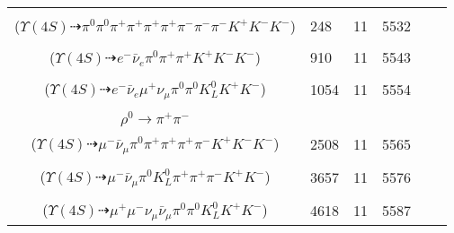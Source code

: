 \documentclass[landscape]{article}
\newcounter{rownumbers}
\newcommand\rn{\stepcounter{rownumbers}\arabic{rownumbers}}
\newcommand{\EOL}{\\} %
\newcommand{\topoTags}[1]{#1} %
\begin{document}
\begin{longtable}{clcccc}
\rn & \makecell[l]{ $ 
\Upsilon(4S) \rightarrow B^{0} \bar{B}^{0} ,
B^{0} \rightarrow \pi^{0} K^{+} K^{-} ,
\bar{B}^{0} \rightarrow \pi^{+} \pi^{+} \pi^{-} \pi^{-} \pi^{-} D^{*+} ,
D^{*+} \rightarrow \pi^{+} D^{0} ,
D^{0} \rightarrow \pi^{0} \pi^{+} K^{-} 
$ \\ ($
\Upsilon(4S) \dashrightarrow \pi^{0} \pi^{0} \pi^{+} \pi^{+} \pi^{+} \pi^{+} \pi^{-} \pi^{-} \pi^{-} K^{+} K^{-} K^{-} 
$) } & \topoTags{248 & }11 & 5532 \EOL

\rn & \makecell[l]{ $ 
\Upsilon(4S) \rightarrow B^{0} \bar{B}^{0} ,
B^{0} \rightarrow \pi^{0} K^{+} K^{-} ,
\bar{B}^{0} \rightarrow e^{-} \bar{\nu}_{e} D^{+} ,
D^{+} \rightarrow \pi^{+} \pi^{+} K^{-} 
$ \\ ($
\Upsilon(4S) \dashrightarrow e^{-} \bar{\nu}_{e} \pi^{0} \pi^{+} \pi^{+} K^{+} K^{-} K^{-} 
$) } & \topoTags{910 & }11 & 5543 \EOL

\rn & \makecell[l]{ $ 
\Upsilon(4S) \rightarrow B^{0} \bar{B}^{0} ,
B^{0} \rightarrow \pi^{0} K^{+} K^{-} ,
\bar{B}^{0} \rightarrow e^{-} \bar{\nu}_{e} D^{*+} ,
D^{*+} \rightarrow \pi^{0} D^{+} ,
D^{+} \rightarrow \mu^{+} \nu_{\mu} \bar{K}^{0} ,
\bar{K}^{0} \rightarrow K_{L}^{0} 
$ \\ ($
\Upsilon(4S) \dashrightarrow e^{-} \bar{\nu}_{e} \mu^{+} \nu_{\mu} \pi^{0} \pi^{0} K_{L}^{0} K^{+} K^{-} 
$) } & \topoTags{1054 & }11 & 5554 \EOL

\rn & \makecell[l]{ $ 
\Upsilon(4S) \rightarrow B^{0} \bar{B}^{0} ,
B^{0} \rightarrow \pi^{0} K^{+} K^{-} ,
\bar{B}^{0} \rightarrow \mu^{-} \bar{\nu}_{\mu} D^{*+} ,
D^{*+} \rightarrow \pi^{+} D^{0} ,
D^{0} \rightarrow K^{-} a_{1}^{+} ,
a_{1}^{+} \rightarrow \rho^{0} \pi^{+} ,
$ \\ $
\rho^{0} \rightarrow \pi^{+} \pi^{-} 
$ \\ ($
\Upsilon(4S) \dashrightarrow \mu^{-} \bar{\nu}_{\mu} \pi^{0} \pi^{+} \pi^{+} \pi^{+} \pi^{-} K^{+} K^{-} K^{-} 
$) } & \topoTags{2508 & }11 & 5565 \EOL

\rn & \makecell[l]{ $ 
\Upsilon(4S) \rightarrow B^{0} \bar{B}^{0} ,
B^{0} \rightarrow \pi^{0} K^{+} K^{-} ,
\bar{B}^{0} \rightarrow \mu^{-} \bar{\nu}_{\mu} D^{*+} ,
D^{*+} \rightarrow \pi^{+} D^{0} ,
D^{0} \rightarrow K_{L}^{0} \pi^{+} \pi^{-} 
$ \\ ($
\Upsilon(4S) \dashrightarrow \mu^{-} \bar{\nu}_{\mu} \pi^{0} K_{L}^{0} \pi^{+} \pi^{+} \pi^{-} K^{+} K^{-} 
$) } & \topoTags{3657 & }11 & 5576 \EOL

\rn & \makecell[l]{ $ 
\Upsilon(4S) \rightarrow B^{0} \bar{B}^{0} ,
B^{0} \rightarrow \pi^{0} K^{+} K^{-} ,
\bar{B}^{0} \rightarrow \mu^{-} \bar{\nu}_{\mu} D^{*+} ,
D^{*+} \rightarrow \pi^{0} D^{+} ,
D^{+} \rightarrow \mu^{+} \nu_{\mu} \bar{K}^{0} ,
\bar{K}^{0} \rightarrow K_{L}^{0} 
$ \\ ($
\Upsilon(4S) \dashrightarrow \mu^{+} \mu^{-} \nu_{\mu} \bar{\nu}_{\mu} \pi^{0} \pi^{0} K_{L}^{0} K^{+} K^{-} 
$) } & \topoTags{4618 & }11 & 5587 \EOL


\end{longtable}
\end{document}
